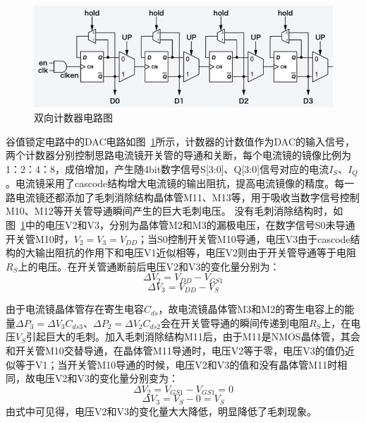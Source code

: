 \begin{figure}[htbp] 
    \centering
    \includegraphics[width=0.8\linewidth]{figures/双向计数器电路.png}
    \caption{双向计数器电路图}
    \label{fig:双向计数器电路}
\end{figure} 

谷值锁定电路中的DAC电路如图~\ref{fig:双向计数器电路}所示，计数器的计数值作为DAC的输入信号，两个计数器分别控制思路电流镜开关管的导通和关断，每个电流镜的镜像比例为1：2：4：8，成倍增加，产生随4bit数字信号S[3:0]、Q[3:0]信号对应的电流$I_S$、$I_Q$。电流镜采用了cascode结构增大电流镜的输出阻抗，提高电流镜像的精度。每一路电流镜还都添加了毛刺消除结构晶体管M11、M13等，用于吸收当数字信号控制M10、M12等开关管导通瞬间产生的巨大毛刺电压。
没有毛刺消除结构时，如图~\ref{fig:双向计数器电路}中的电压V2和V3，分别为晶体管M2和M3的漏极电压，在数字信号S0未导通开关管M10时，$V_2=V_3=V_{DD}$；当S0控制开关管M10导通，电压V3由于cascode结构的大输出阻抗的作用下和电压V1近似相等，电压V2则由于开关管导通等于电阻$R_S$上的电压。在开关管通断前后电压V2和V3的变化量分别为：
\begin{equation}
    \label{eq:△V2公式}
    \varDelta V_2 = V_{DD} - V_{GS1}
\end{equation}
\begin{equation}
    \label{eq:△V3公式}
    \varDelta V_3 = V_{DD} - V_S
\end{equation}

由于电流镜晶体管存在寄生电容$C_{ds}$，故电流镜晶体管M3和M2的寄生电容上的能量$\varDelta P_3 = \varDelta V_3 C_{ds3}$、$\varDelta P_2 = \varDelta V_2 C_{ds2}$会在开关管导通的瞬间传递到电阻$R_S$上，在电压$V_S$引起巨大的毛刺。加入毛刺消除结构M11后，由于M11是NMOS晶体管，其会和开关管M10交替导通，在晶体管M11导通时，电压V2等于零，电压V3的值仍近似等于V1；当开关管M10导通的时候，电压V2和V3的值和没有晶体管M11时相同，故电压V2和V3的变化量分别变为：
\begin{equation}
    \label{eq:△V2公式1}
    \varDelta V_2 = V_{GS1} - V_{GS1} = 0
\end{equation}
\begin{equation}
    \label{eq:△V3公式1}
    \varDelta V_3 = V_S - 0 = V_S
\end{equation}
由式中可见得，电压V2和V3的变化量大大降低，明显降低了毛刺现象。

